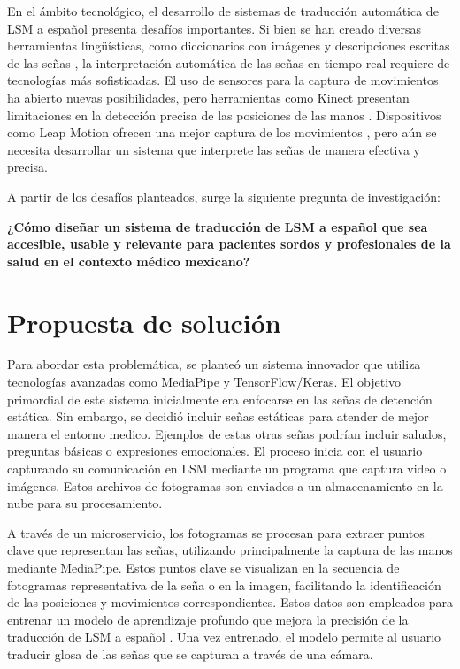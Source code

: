 En  el  ámbito  tecnológico,  el  desarrollo  de  sistemas  de  traducción  automática  de  LSM  a  español  presenta  desafíos  importantes.  Si  bien  se  han  creado  diversas  herramientas  lingüísticas,  como  diccionarios  con  imágenes  y  descripciones  escritas  de  las  señas  \cite{ref15},  la  interpretación  automática  de  las  señas  en  tiempo  real  requiere  de  tecnologías  más  sofisticadas.  El  uso  de  sensores  para  la  captura  de  movimientos  ha  abierto  nuevas  posibilidades,  pero  herramientas  como  Kinect  presentan  limitaciones  en  la  detección  precisa  de  las  posiciones  de  las  manos  \cite{ref14}.  Dispositivos  como  Leap  Motion  ofrecen  una  mejor  captura  de  los  movimientos  \cite{ref13},  pero  aún  se  necesita  desarrollar  un  sistema  que  interprete  las  señas  de  manera  efectiva  y  precisa.

A partir de los desafíos planteados, surge la siguiente pregunta de investigación:

\textbf{¿Cómo  diseñar  un  sistema  de  traducción  de  LSM  a  español  que  sea  accesible,  usable  y  relevante  para  pacientes  sordos  y  profesionales  de  la  salud  en  el  contexto  médico  mexicano?}
\clearpage
\section{Propuesta de solución}
Para abordar esta problemática, se planteó un sistema innovador que utiliza tecnologías avanzadas como MediaPipe y TensorFlow/Keras. El objetivo primordial de este sistema inicialmente era enfocarse en las señas de detención estática. Sin embargo, se decidió incluir señas estáticas para atender de mejor manera el entorno medico. Ejemplos de estas otras señas podrían incluir saludos, preguntas básicas o expresiones emocionales. El proceso inicia con el usuario capturando su comunicación en LSM mediante un programa que captura video o imágenes.
Estos archivos de fotogramas son enviados a un almacenamiento en la nube para su procesamiento.

A través de un microservicio, los fotogramas se procesan para extraer puntos clave que representan las señas, utilizando principalmente la captura de las manos mediante MediaPipe. Estos puntos clave se visualizan en la secuencia de fotogramas representativa de la seña o en la imagen, facilitando la identificación de las posiciones y movimientos correspondientes. Estos datos son empleados para entrenar un modelo de aprendizaje profundo que mejora la precisión de la traducción de LSM a español \cite{ref9}. Una vez entrenado, el modelo permite al usuario traducir glosa de las señas que se capturan a través de una cámara.

